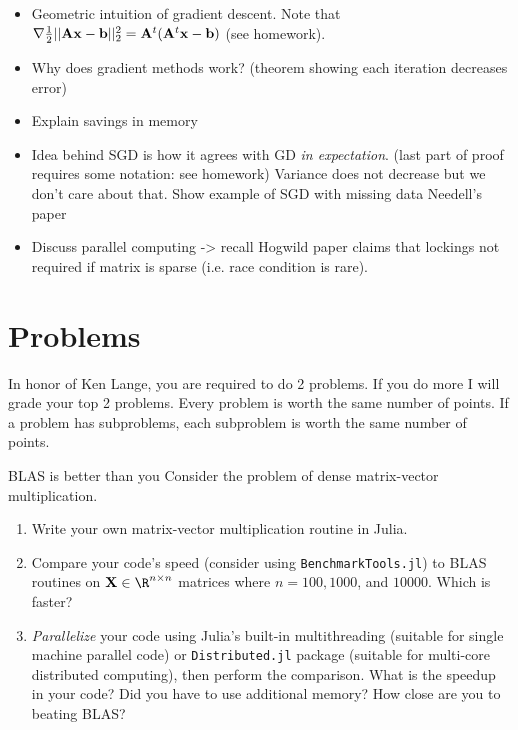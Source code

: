 \documentclass[./some_latex_template.tex]{subfiles}
\begin{document}
\begin{itemize}
	\item Geometric intuition of gradient descent. Note that $\nabla \frac{1}{2}||\mathbf{A}\mathbf{x} - \mathbf{b}||_2^2 = \mathbf{A}^t(\mathbf{A}^t\mathbf{x} - \mathbf{b})$ (see homework).
	\item Why does gradient methods work? (theorem showing each iteration decreases error)
	\item Explain savings in memory
	\item Idea behind SGD is how it agrees with GD \textit{in expectation}. (last part of proof requires some notation: see homework) Variance does not decrease but we don't care about that. Show example of SGD with missing data Needell's paper
	\item Discuss parallel computing -> recall Hogwild paper claims that lockings not required if matrix is sparse (i.e. race condition is rare). 
\end{itemize}



\section{Problems}
In honor of Ken Lange, you are required to do 2 problems. If you do more I will grade your top 2 problems. Every problem is worth the same number of points. If a problem has subproblems, each subproblem is worth the same number of points.

\begin{problembox}{{BLAS is better than you}}{}
Consider the problem of dense matrix-vector multiplication. 
\begin{enumerate}
	\item Write your own matrix-vector multiplication routine in Julia.
	\item Compare your code's speed (consider using \texttt{BenchmarkTools.jl}) to BLAS routines on $\bX \in \R^{n \times n}$ matrices where $n = 100, 1000$, and $10000$. Which is faster?
	\item \textit{Parallelize} your code using Julia's built-in multithreading (suitable for single machine parallel code) or \texttt{Distributed.jl} package (suitable for multi-core distributed computing), then perform the comparison. What is the speedup in your code? Did you have to use additional memory? How close are you to beating BLAS?
\end{enumerate}
\end{problembox}
\end{document}
